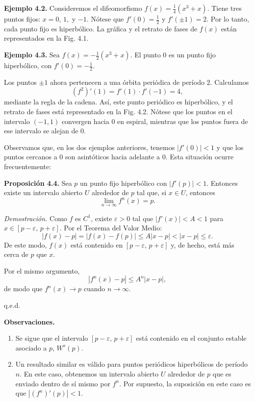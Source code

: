 \documentclass[10pt,a4paper]{book}
\begin{document}
\medskip

\textbf{Ejemplo 4.2.} Consideremos el difeomorfismo $f(x)=\tfrac{1}{4}(x^{3}+x)$.  
Tiene tres puntos fijos: $x=0,\,1,$ y $-1$.  
Nótese que $f'(0)=\tfrac{1}{2}$ y $f'(\pm 1)=2$.  
Por lo tanto, cada punto fijo es hiperbólico.  
La gráfica y el retrato de fases de $f(x)$ están representados en la Fig. 4.1.

\newpage

\textbf{Ejemplo 4.3.} Sea $f(x)=-\tfrac{1}{2}(x^{3}+x)$.  
El punto $0$ es un punto fijo hiperbólico, con $f'(0)=-\tfrac{1}{2}$.  

Los puntos $\pm 1$ ahora pertenecen a una órbita periódica de período $2$.  
Calculamos
$$
(f^{2})'(1) = f'(1)\cdot f'(-1) = 4,
$$
mediante la regla de la cadena.  
Así, este punto periódico es hiperbólico, y el retrato de fases está representado en la Fig. 4.2. Nótese que los puntos en el intervalo $(-1,1)$ convergen hacia $0$ en espiral, mientras que los puntos fuera de ese intervalo se alejan de $0$.

\newpage

Observamos que, en los dos ejemplos anteriores, tenemos $|f'(0)|<1$ y que los puntos cercanos a $0$ son
asintóticos hacia adelante a $0$.  
Esta situación ocurre frecuentemente:

\medskip

\textbf{Proposición 4.4.} Sea $p$ un punto fijo hiperbólico con $|f'(p)|<1$.  
Entonces existe un intervalo abierto $U$ alrededor de $p$ tal que, si $x \in U$, entonces
\[
\lim_{n \to \infty} f^{n}(x) = p.
\]

\medskip

\emph{Demostración.} Como $f$ es $C^{1}$, existe $\varepsilon>0$ tal que $|f'(x)|<A<1$ para $x \in [p-\varepsilon,\,p+\varepsilon]$.  
Por el Teorema del Valor Medio:
\[
|f(x)-p| = |f(x)-f(p)| \leq A|x-p| < |x-p| \leq \varepsilon.
\]
De este modo, $f(x)$ está contenido en $[p-\varepsilon,\,p+\varepsilon]$ y, de hecho, está más cerca de $p$ que $x$.

Por el mismo argumento,
\[
|f^{n}(x)-p| \leq A^{n}|x-p|,
\]
de modo que $f^{n}(x) \to p$ cuando $n \to \infty$.

\hfill q.e.d.

\bigskip

\textbf{Observaciones.}

\begin{enumerate}
	\item Se sigue que el intervalo $[p-\varepsilon,\,p+\varepsilon]$ está contenido en el conjunto estable
asociado a $p$, $W^{s}(p)$.

	\item Un resultado similar es válido para puntos periódicos hiperbólicos de período $n$.  En este caso, obtenemos un intervalo abierto $U$ alrededor de $p$ que es enviado dentro de sí mismo por $f^{n}$. Por supuesto, la suposición en este caso es que $|(f^{n})'(p)|<1$.

\end{enumerate}
\end{document}
